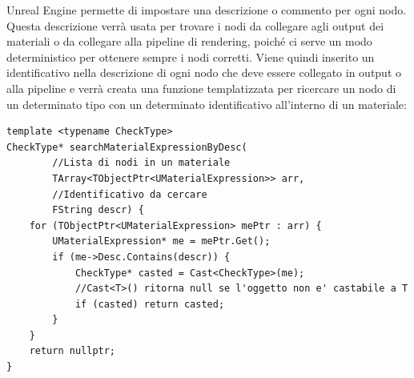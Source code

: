 \documentclass[main.tex]{subfiles}
\begin{document}
Unreal Engine permette di impostare una descrizione o commento per ogni nodo. Questa descrizione verrà usata per trovare i nodi da collegare agli output dei materiali o da collegare alla pipeline di rendering, poiché ci serve un modo deterministico per ottenere sempre i nodi corretti. Viene quindi inserito un identificativo nella descrizione di ogni nodo che deve essere collegato in output o alla pipeline e verrà creata una funzione templatizzata per ricercare un nodo di un determinato tipo con un determinato identificativo all'interno di un materiale:
\begin{lstlisting}
template <typename CheckType>
CheckType* searchMaterialExpressionByDesc(
        //Lista di nodi in un materiale
        TArray<TObjectPtr<UMaterialExpression>> arr,
        //Identificativo da cercare
        FString descr) {
    for (TObjectPtr<UMaterialExpression> mePtr : arr) {
        UMaterialExpression* me = mePtr.Get();
        if (me->Desc.Contains(descr)) {
            CheckType* casted = Cast<CheckType>(me);
            //Cast<T>() ritorna null se l'oggetto non e' castabile a T
            if (casted) return casted;
        }
    }
    return nullptr;
}
\end{lstlisting}
\end{document}
